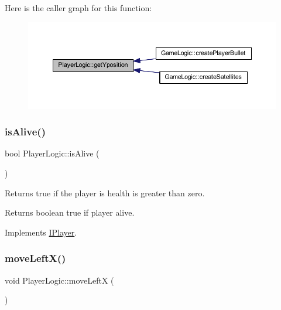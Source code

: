 Here is the caller graph for this function\+:\nopagebreak
\begin{figure}[H]
\begin{center}
\leavevmode
\includegraphics[width=350pt]{class_player_logic_a58d683bde5ee078f3b21897f2a5f4677_icgraph}
\end{center}
\end{figure}
\mbox{\label{class_player_logic_a765133271ba47a6fa9b2b45136f1fe73}} 
\subsubsection{\texorpdfstring{is\+Alive()}{isAlive()}}
{\footnotesize\ttfamily bool Player\+Logic\+::is\+Alive (\begin{DoxyParamCaption}{ }\end{DoxyParamCaption})\hspace{0.3cm}{\ttfamily [virtual]}}



Returns true if the player is health is greater than zero. 

\begin{DoxyReturn}{Returns}
boolean true if player alive. 
\end{DoxyReturn}


Implements \hyperlink{class_i_player_a5b417cd92b4463e1c296a627430282b6}{I\+Player}.

\mbox{\label{class_player_logic_ac4d252e80757e05b5799ab689ee27d5e}} 
\subsubsection{\texorpdfstring{move\+Left\+X()}{moveLeftX()}}
{\footnotesize\ttfamily void Player\+Logic\+::move\+LeftX (\begin{DoxyParamCaption}{ }\end{DoxyParamCaption})\hspace{0.3cm}{\ttfamily [virtual]}}



